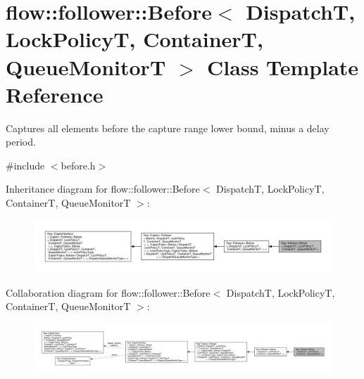 \hypertarget{classflow_1_1follower_1_1_before}{}\section{flow\+:\+:follower\+:\+:Before$<$ DispatchT, Lock\+PolicyT, ContainerT, Queue\+MonitorT $>$ Class Template Reference}
\label{classflow_1_1follower_1_1_before}


Captures all elements before the capture range lower bound, minus a delay period.  




{\ttfamily \#include $<$before.\+h$>$}



Inheritance diagram for flow\+:\+:follower\+:\+:Before$<$ DispatchT, Lock\+PolicyT, ContainerT, Queue\+MonitorT $>$\+:
\nopagebreak
\begin{figure}[H]
\begin{center}
\leavevmode
\includegraphics[width=350pt]{classflow_1_1follower_1_1_before__inherit__graph}
\end{center}
\end{figure}


Collaboration diagram for flow\+:\+:follower\+:\+:Before$<$ DispatchT, Lock\+PolicyT, ContainerT, Queue\+MonitorT $>$\+:
\nopagebreak
\begin{figure}[H]
\begin{center}
\leavevmode
\includegraphics[width=350pt]{classflow_1_1follower_1_1_before__coll__graph}
\end{center}
\end{figure}
